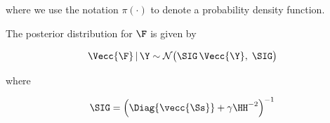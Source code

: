 where we use the notation $\pi(\cdot)$ to denote a probability density function.

\begin{theorem}
    The posterior distribution for $\F$ is given by 

    \begin{equation}
        \label{eq:F_post}
            \Vecc{\F} \, | \, \Y \sim \mathcal{N} \big(\SIG \, \Vecc{\Y}, \; \SIG \big)
        \end{equation}
        
        \noindent where 
        
        \begin{equation}
        \label{eq:Sig_post}
            \SIG = \Big(\Diag{\vecc{\Ss}} + \gamma  \HH^{-2}\Big)^{-1}
        \end{equation}

\end{theorem}

